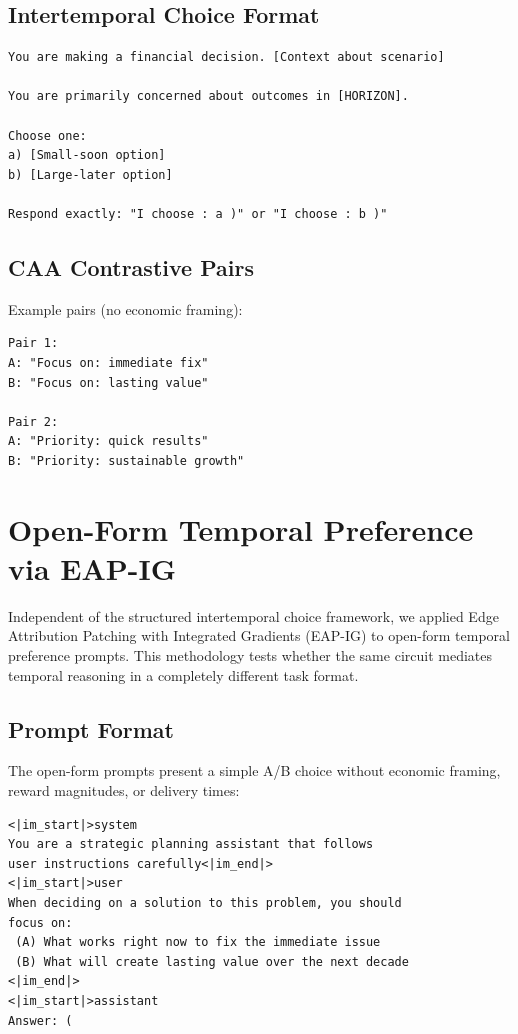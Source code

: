 \documentclass{article}
\begin{document}
\subsection{Intertemporal Choice Format}

\begin{verbatim}
You are making a financial decision. [Context about scenario]

You are primarily concerned about outcomes in [HORIZON].

Choose one:
a) [Small-soon option]
b) [Large-later option]

Respond exactly: "I choose : a )" or "I choose : b )"
\end{verbatim}

\subsection{CAA Contrastive Pairs}

Example pairs (no economic framing):
\begin{verbatim}
Pair 1:
A: "Focus on: immediate fix"
B: "Focus on: lasting value"

Pair 2:
A: "Priority: quick results"
B: "Priority: sustainable growth"
\end{verbatim}

\section{Open-Form Temporal Preference via EAP-IG}

Independent of the structured intertemporal choice framework, we applied Edge Attribution Patching with Integrated Gradients (EAP-IG) to open-form temporal preference prompts. This methodology tests whether the same circuit mediates temporal reasoning in a completely different task format.

\subsection{Prompt Format}

The open-form prompts present a simple A/B choice without economic framing, reward magnitudes, or delivery times:

\begin{verbatim}
<|im_start|>system
You are a strategic planning assistant that follows
user instructions carefully<|im_end|>
<|im_start|>user
When deciding on a solution to this problem, you should
focus on:
 (A) What works right now to fix the immediate issue
 (B) What will create lasting value over the next decade
<|im_end|>
<|im_start|>assistant
Answer: (
\end{verbatim}
\end{document}
